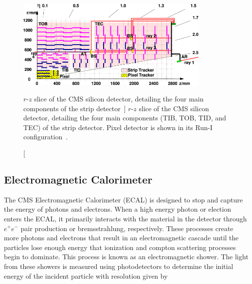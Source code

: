 \begin{figure}[htbp]
	\centering
	\includegraphics[width=0.85\textwidth]{figs/03_experiment/las.png}
	\caption
	[$r$-$z$ slice of the CMS silicon detector, detailing the four main components of the strip detector~\cite{Chatrchyan:1211825}]
	{$r$-$z$ slice of the CMS silicon detector, detailing the four main components (TIB, TOB, TID, and TEC) of the strip detector. Pixel detector is shown in its Run-I configuration~\cite{Chatrchyan:1211825}.}
	\label{fig:strip}
\end{figure}

\subsection{Electromagnetic Calorimeter} \label{sec:CMS_ECAL}
The CMS Electromagnetic Calorimeter (ECAL) is designed to stop and capture the energy of photons and electrons. When a high energy photon or election enters the ECAL, it primarily interacts with the material in the detector through $e^+e^-$ pair production or bremsstrahlung, respectively. These processes create more photons and electrons that result in an electromagnetic cascade until the particles lose enough energy that ionization and compton scattering processes begin to dominate. This process is known as an electromagnetic shower. The light from these showers is measured using photodetectors to determine the initial energy of the incident particle with resolution given by


